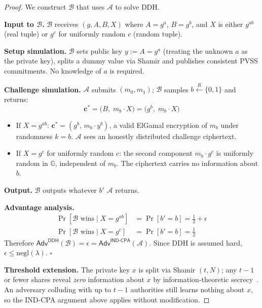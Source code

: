 \documentclass[12pt,a4paper]{article}
\theoremstyle{definition}
\theoremstyle{remark}
\begin{document}
\begin{proof}
  We construct $\mathcal{B}$ that uses $\mathcal{A}$ to solve DDH.

  \textbf{Input to $\mathcal{B}$.}
  $\mathcal{B}$ receives $(g, A, B, X)$ where $A = g^a$, $B = g^b$, and
  $X$ is either $g^{ab}$ (real tuple) or $g^c$ for uniformly random $c$
  (random tuple).

  \textbf{Setup simulation.}
  $\mathcal{B}$ sets public key $y := A = g^a$ (treating the unknown $a$
  as the private key), splits a dummy value via Shamir and publishes
  consistent PVSS commitments. No knowledge of $a$ is required.

  \textbf{Challenge simulation.}
  $\mathcal{A}$ submits $(m_0, m_1)$; $\mathcal{B}$ samples
  $b \xleftarrow{R} \{0,1\}$ and returns:
  \begin{equation}
    \mathbf{c}^* = \bigl(B,\; m_b \cdot X\bigr) = \bigl(g^b,\; m_b \cdot X\bigr)
  \end{equation}
  \begin{itemize}
    \item If $X = g^{ab}$: $\mathbf{c}^* = (g^b,\, m_b \cdot y^b)$, a valid
      ElGamal encryption of $m_b$ under randomness $k = b$.
      $\mathcal{A}$ sees an honestly distributed challenge ciphertext.
    \item If $X = g^c$ for uniformly random $c$: the second component
      $m_b \cdot g^c$ is uniformly random in $\mathbb{G}$, independent of
      $m_b$. The ciphertext carries no information about $b$.
  \end{itemize}

  \textbf{Output.}
  $\mathcal{B}$ outputs whatever $b'$ $\mathcal{A}$ returns.

  \textbf{Advantage analysis.}
  \begin{align*}
    \Pr[\mathcal{B}\text{ wins} \mid X = g^{ab}]
      &= \Pr[b' = b] = \tfrac{1}{2} + \epsilon \\
    \Pr[\mathcal{B}\text{ wins} \mid X = g^c]
      &= \Pr[b' = b] = \tfrac{1}{2}
  \end{align*}
  Therefore
  $\mathsf{Adv}^{\mathsf{DDH}}(\mathcal{B}) = \epsilon
   = \mathsf{Adv}^{\mathsf{IND\text{-}CPA}}(\mathcal{A})$.
  Since DDH is assumed hard, $\epsilon \leq \mathrm{negl}(\lambda)$.
  \hfill$\square$

  \textbf{Threshold extension.}
  The private key $x$ is split via Shamir $(t,N)$; any $t-1$ or fewer
  shares reveal \emph{zero} information about $x$ by information-theoretic
  secrecy~\cite{shamir1979}. An adversary colluding with up to $t-1$
  authorities still learns nothing about $x$, so the IND-CPA argument above
  applies without modification.
\end{proof}
\end{document}
